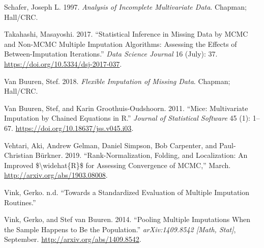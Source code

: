 \documentclass[
  Royal, times, sageapa]{sagej}
\begin{document}
\leavevmode\hypertarget{ref-scha97}{}%
Schafer, Joseph L. 1997. \emph{Analysis of Incomplete Multivariate
Data}. Chapman; Hall/CRC.

\leavevmode\hypertarget{ref-taka17}{}%
Takahashi, Masayoshi. 2017. ``Statistical Inference in Missing Data by
MCMC and Non-MCMC Multiple Imputation Algorithms: Assessing the Effects
of Between-Imputation Iterations.'' \emph{Data Science Journal} 16
(July): 37. \url{https://doi.org/10.5334/dsj-2017-037}.

\leavevmode\hypertarget{ref-buur18}{}%
Van Buuren, Stef. 2018. \emph{Flexible Imputation of Missing Data}.
Chapman; Hall/CRC.

\leavevmode\hypertarget{ref-mice}{}%
Van Buuren, Stef, and Karin Groothuis-Oudshoorn. 2011. ``Mice:
Multivariate Imputation by Chained Equations in R.'' \emph{Journal of
Statistical Software} 45 (1): 1--67.
\url{https://doi.org/10.18637/jss.v045.i03}.

\leavevmode\hypertarget{ref-veht19}{}%
Vehtari, Aki, Andrew Gelman, Daniel Simpson, Bob Carpenter, and
Paul-Christian Bürkner. 2019. ``Rank-Normalization, Folding, and
Localization: An Improved \$\textbackslash widehat\{R\}\$ for Assessing
Convergence of MCMC,'' March. \url{http://arxiv.org/abs/1903.08008}.

\leavevmode\hypertarget{ref-vinknd}{}%
Vink, Gerko. n.d. ``Towards a Standardized Evaluation of Multiple
Imputation Routines.''

\leavevmode\hypertarget{ref-vink14}{}%
Vink, Gerko, and Stef van Buuren. 2014. ``Pooling Multiple Imputations
When the Sample Happens to Be the Population.'' \emph{arXiv:1409.8542
{[}Math, Stat{]}}, September. \url{http://arxiv.org/abs/1409.8542}.
\end{document}
